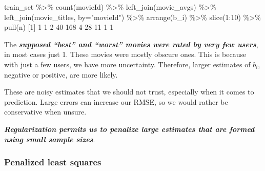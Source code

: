 \documentclass[
]{article}
\newenvironment{Shaded}{}{}
\newcommand{\AttributeTok}[1]{\textcolor[rgb]{0.49,0.56,0.16}{#1}}
\newcommand{\DecValTok}[1]{\textcolor[rgb]{0.25,0.63,0.44}{#1}}
\newcommand{\FunctionTok}[1]{\textcolor[rgb]{0.02,0.16,0.49}{#1}}
\newcommand{\NormalTok}[1]{#1}
\newcommand{\SpecialCharTok}[1]{\textcolor[rgb]{0.25,0.44,0.63}{#1}}
\newcommand{\StringTok}[1]{\textcolor[rgb]{0.25,0.44,0.63}{#1}}
\begin{document}
\begin{Shaded}
\begin{Highlighting}[]
\NormalTok{train\_set }\SpecialCharTok{\%\textgreater{}\%} \FunctionTok{count}\NormalTok{(movieId) }\SpecialCharTok{\%\textgreater{}\%} 
  \FunctionTok{left\_join}\NormalTok{(movie\_avgs) }\SpecialCharTok{\%\textgreater{}\%}
  \FunctionTok{left\_join}\NormalTok{(movie\_titles, }\AttributeTok{by=}\StringTok{"movieId"}\NormalTok{) }\SpecialCharTok{\%\textgreater{}\%}
  \FunctionTok{arrange}\NormalTok{(b\_i) }\SpecialCharTok{\%\textgreater{}\%} 
  \FunctionTok{slice}\NormalTok{(}\DecValTok{1}\SpecialCharTok{:}\DecValTok{10}\NormalTok{) }\SpecialCharTok{\%\textgreater{}\%} 
  \FunctionTok{pull}\NormalTok{(n)}
\NormalTok{ [}\DecValTok{1}\NormalTok{]   }\DecValTok{1}   \DecValTok{1}   \DecValTok{2}  \DecValTok{40} \DecValTok{168}   \DecValTok{4}  \DecValTok{28}  \DecValTok{11}   \DecValTok{1}   \DecValTok{1}
\end{Highlighting}
\end{Shaded}

The \textbf{\emph{supposed ``best'' and ``worst'' movies were rated by
very few users}}, in most cases just 1. These movies were mostly obscure
ones. This is because with just a few users, we have more uncertainty.
Therefore, larger estimates of \(b_{i}\), negative or positive, are more
likely.

These are noisy estimates that we should not trust, especially when it
comes to prediction. Large errors can increase our RMSE, so we would
rather be conservative when unsure.

\textbf{\emph{Regularization permits us to penalize large estimates that
are formed using small sample sizes}}.

\newpage

\hypertarget{penalized-least-squares}{%
\subsubsection{Penalized least squares}\label{penalized-least-squares}}
\end{document}
